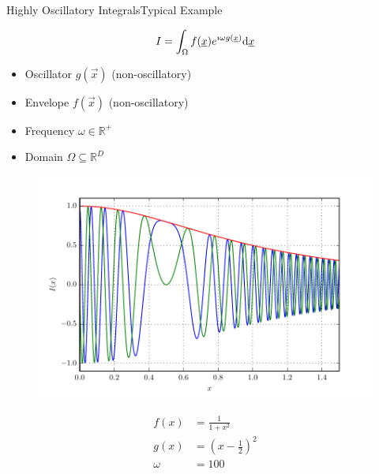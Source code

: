 \documentclass{beamer}
\begin{document}
\begin{frame}{Highly Oscillatory Integrals}{Typical Example}
  \begin{minipage}{0.5\linewidth}
    \begin{equation*}
      I = \int_{\Omega} f(\underline{x}) e^{\imath \omega g(\underline{x})} \mathrm{d}\underline{x}
    \end{equation*}
    \begin{itemize}
      \item Oscillator $g(\vec{x})$ (non-oscillatory)
      \item Envelope $f(\vec{x})$ (non-oscillatory)
      \item Frequency $\omega \in \mathbb{R}^{+}$
      \item Domain $\Omega \subseteq \mathbb{R}^D$
    \end{itemize}
  \end{minipage}
  \begin{minipage}{0.48\linewidth}
    \begin{figure}
      \centering
      \includegraphics[width=\linewidth]{./fig/oscillatory_example.pdf}
    \end{figure}
    \vspace{-0.6cm}
    \begin{align*}
      f(x) & = \frac{1}{1+x^2} \\
      g(x) & = \left(x - \frac{1}{2}\right)^2 \\
      \omega & = 100
    \end{align*}
  \end{minipage}
\end{frame}
\end{document}
